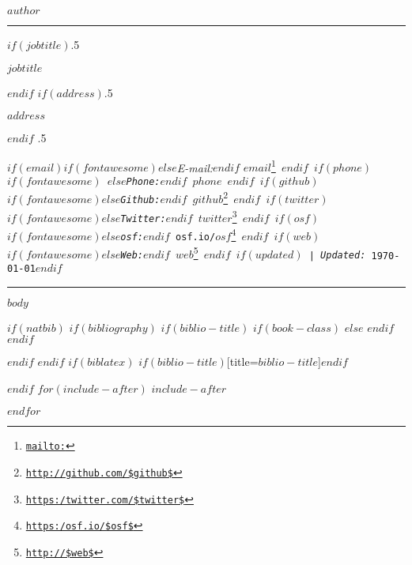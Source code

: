\documentclass[$if(fontsize)$$fontsize$,$endif$$if(lang)$$babel-lang$,$endif$$if(papersize)$$papersize$paper,$endif$$for(classoption)$$classoption$$sep$,$endfor$]{$documentclass$}
\renewcommand{\href}[2]{#2\footnote{\url{#1}}}
\begin{document}
\centerline{\huge \bf $author$}

\vspace{2 mm}

\hrule

\vspace{2 mm}

$if(jobtitle)$\moveleft.5\hoffset\centerline{$jobtitle$}$endif$
$if(address)$\moveleft.5\hoffset\centerline{$address$}$endif$
\moveleft.5\hoffset\centerline{ $if(email)$$if(fontawesome)$\faEnvelopeO \hspace{1 mm}$else$\emph{E-mail:}$endif$ \href{mailto:}{\tt $email$} \hspace{1 mm}$endif$ $if(phone)$$if(fontawesome)$ \faPhone \hspace{1 mm}$else$\emph{Phone:}$endif$  $phone$  \hspace{1 mm} $endif$ $if(github)$$if(fontawesome)$\faGithub \hspace{1 mm}$else$\emph{Github:}$endif$ \href{http://github.com/$github$}{\tt $github$} \hspace{1 mm} $endif$  $if(twitter)$$if(fontawesome)$\faTwitter \hspace{1 mm}$else$\emph{Twitter:}$endif$ \href{https:/twitter.com/$twitter$}{\tt $twitter$} \hspace{1 mm} $endif$ $if(osf)$$if(fontawesome)$\faUnlock \hspace{1 mm}$else$\emph{osf:}$endif$ \href{https:/osf.io/$osf$}{\tt osf.io/$osf$} \hspace{1 mm} $endif$ $if(web)$$if(fontawesome)$\faGlobe \hspace{1 mm}$else$\emph{Web:}$endif$ \href{http://$web$}{\tt $web$}  $endif$ $if(updated)$ | \emph{Updated:} \apstylekinda\today$endif$}

\vspace{2 mm}

\hrule


$body$

$if(natbib)$
$if(bibliography)$
$if(biblio-title)$
$if(book-class)$
\renewcommand\bibname{$biblio-title$}
$else$
\renewcommand\refname{$biblio-title$}
$endif$
$endif$


$endif$
$endif$
$if(biblatex)$
\printbibliography$if(biblio-title)$[title=$biblio-title$]$endif$

$endif$
$for(include-after)$
$include-after$

$endfor$
\end{document}
